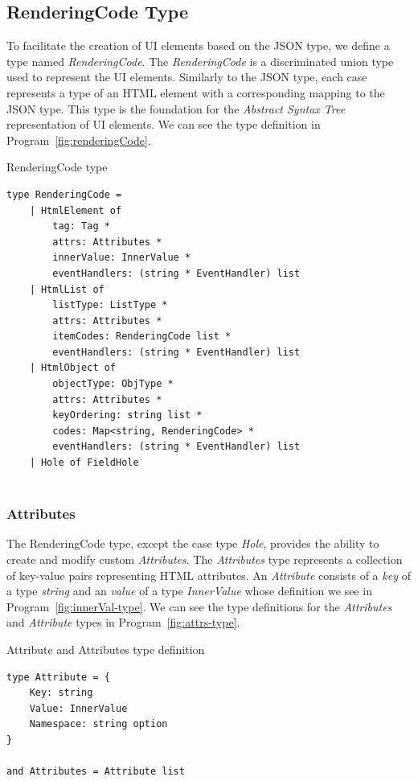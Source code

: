 \subsection{RenderingCode Type}
To facilitate the creation of UI elements based on the JSON type, we define a type named \emph{RenderingCode}.
The \emph{RenderingCode} is a discriminated union type used to represent the UI elements.
Similarly to the JSON type, each case represents a type of an HTML element with a corresponding mapping to the JSON type.
This type is the foundation for the \emph{Abstract Syntax Tree} representation of UI elements.
We can see the type definition in Program~\ref{fig:renderingCode}.
\begin{listing}[htbp]
	\caption {RenderingCode type}
	\label{fig:renderingCode}
	\begin{lstlisting}
type RenderingCode =
    | HtmlElement of 
        tag: Tag * 
        attrs: Attributes * 
        innerValue: InnerValue * 
        eventHandlers: (string * EventHandler) list
    | HtmlList of
        listType: ListType *
        attrs: Attributes *
        itemCodes: RenderingCode list *
        eventHandlers: (string * EventHandler) list
    | HtmlObject of
        objectType: ObjType *
        attrs: Attributes *
        keyOrdering: string list *
        codes: Map<string, RenderingCode> *
        eventHandlers: (string * EventHandler) list
    | Hole of FieldHole
 
  \end{lstlisting}
\end{listing}

\subsubsection{Attributes}
The RenderingCode type, except the case type \emph{Hole}, provides the ability to create and modify custom \emph{Attributes}.
The \emph{Attributes} type represents a collection of key-value pairs representing HTML attributes.
An \emph{Attribute} consists of a \emph{key} of a type \emph{string} and an \emph{value} of a type \emph{InnerValue} whose definition we see in Program~\ref{fig:innerVal-type}.
We can see the type definitions for the \emph{Attributes} and \emph{Attribute} types in Program~\ref{fig:attrs-type}.
\begin{listing}[H]
	\caption{Attribute and Attributes type definition}
	\label{fig:attrs-type}
	\begin{lstlisting}
type Attribute = {
    Key: string
    Value: InnerValue
    Namespace: string option
}

and Attributes = Attribute list
    \end{lstlisting}
\end{listing}

